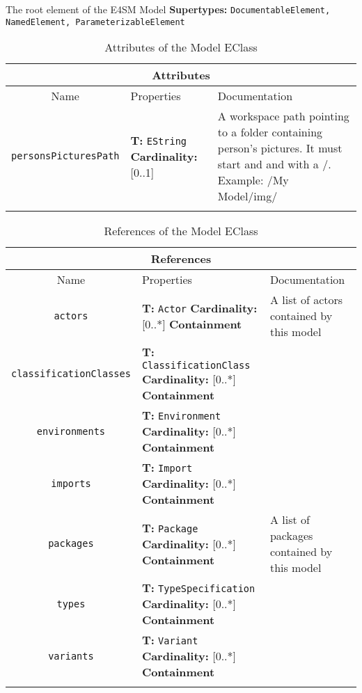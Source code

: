 \documentclass{article}
\begin{document}
The root element of the E4SM Model
\textbf{Supertypes: }\texttt{DocumentableElement, NamedElement, ParameterizableElement}
\begin{table}[H]
\footnotesize
\begin{tabularx}{\textwidth}{|c| p{4 cm} | X |}
\hline
\multicolumn{3}{|c|}{\textbf{Attributes}} \\
\hline
Name & Properties & Documentation \\ \hline \hline
\texttt{personsPicturesPath}
 & 
\textbf{T:} \texttt{EString}
\newline
\textbf{Cardinality:} [0..1]
 & A workspace path pointing to a folder containing person's pictures. It must start and and with a /. Example: /My Model/img/\\ \hline
\caption{Attributes of the Model EClass}
\end{tabularx}
\label{e4smModelattr}
\end{table}
\begin{table}[H]
\footnotesize
\begin{tabularx}{\textwidth}{|c| p{4 cm} | X |}
\hline
\multicolumn{3}{|c|}{\textbf{References}} \\
\hline
Name & Properties & Documentation \\ \hline \hline
\texttt{actors}
 & 
\textbf{T:} \texttt{Actor}
\newline
\textbf{Cardinality:} [0..*]
\newline
\textbf{Containment}
 & A list of actors contained by this model\\ \hline
\texttt{classificationClasses}
 & 
\textbf{T:} \texttt{ClassificationClass}
\newline
\textbf{Cardinality:} [0..*]
\newline
\textbf{Containment}
 & \\ \hline
\texttt{environments}
 & 
\textbf{T:} \texttt{Environment}
\newline
\textbf{Cardinality:} [0..*]
\newline
\textbf{Containment}
 & \\ \hline
\texttt{imports}
 & 
\textbf{T:} \texttt{Import}
\newline
\textbf{Cardinality:} [0..*]
\newline
\textbf{Containment}
 & \\ \hline
\texttt{packages}
 & 
\textbf{T:} \texttt{Package}
\newline
\textbf{Cardinality:} [0..*]
\newline
\textbf{Containment}
 & A list of packages contained by this model\\ \hline
\texttt{types}
 & 
\textbf{T:} \texttt{TypeSpecification}
\newline
\textbf{Cardinality:} [0..*]
\newline
\textbf{Containment}
 & \\ \hline
\texttt{variants}
 & 
\textbf{T:} \texttt{Variant}
\newline
\textbf{Cardinality:} [0..*]
\newline
\textbf{Containment}
 & \\ \hline
\caption{References of the Model EClass}
\end{tabularx}
\label{e4smModelref}
\end{table}
\end{document}
